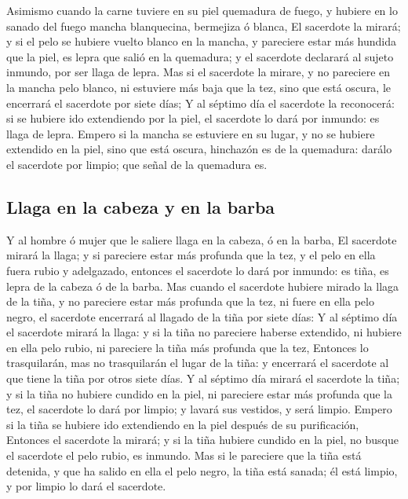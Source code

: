  Asimismo cuando la carne tuviere en su piel quemadura de
fuego, y hubiere en lo sanado del fuego mancha blanquecina, bermejiza ó
blanca,  El sacerdote la mirará; y si el pelo se hubiere
vuelto blanco en la mancha, y pareciere estar más hundida que la piel,
es lepra que salió en la quemadura; y el sacerdote declarará al sujeto
inmundo, por ser llaga de lepra.  Mas si el sacerdote la
mirare, y no pareciere en la mancha pelo blanco, ni estuviere más baja
que la tez, sino que está oscura, le encerrará el sacerdote por siete
días;  Y al séptimo día el sacerdote la reconocerá: si se
hubiere ido extendiendo por la piel, el sacerdote lo dará por inmundo:
es llaga de lepra.  Empero si la mancha se estuviere en su
lugar, y no se hubiere extendido en la piel, sino que está oscura,
hinchazón es de la quemadura: darálo el sacerdote por limpio; que señal
de la quemadura es.

\hypertarget{llaga-en-la-cabeza-y-en-la-barba}{%
\subsection{Llaga en la cabeza y en la
barba}\label{llaga-en-la-cabeza-y-en-la-barba}}

 Y al hombre ó mujer que le saliere llaga en la cabeza, ó
en la barba,  El sacerdote mirará la llaga; y si pareciere
estar más profunda que la tez, y el pelo en ella fuera rubio y
adelgazado, entonces el sacerdote lo dará por inmundo: es tiña, es lepra
de la cabeza ó de la barba.  Mas cuando el sacerdote
hubiere mirado la llaga de la tiña, y no pareciere estar más profunda
que la tez, ni fuere en ella pelo negro, el sacerdote encerrará al
llagado de la tiña por siete días:  Y al séptimo día el
sacerdote mirará la llaga: y si la tiña no pareciere haberse extendido,
ni hubiere en ella pelo rubio, ni pareciere la tiña más profunda que la
tez,  Entonces lo trasquilarán, mas no trasquilarán el
lugar de la tiña: y encerrará el sacerdote al que tiene la tiña por
otros siete días.  Y al séptimo día mirará el sacerdote la
tiña; y si la tiña no hubiere cundido en la piel, ni pareciere estar más
profunda que la tez, el sacerdote lo dará por limpio; y lavará sus
vestidos, y será limpio.  Empero si la tiña se hubiere ido
extendiendo en la piel después de su purificación, 
Entonces el sacerdote la mirará; y si la tiña hubiere cundido en la
piel, no busque el sacerdote el pelo rubio, es inmundo. 
Mas si le pareciere que la tiña está detenida, y que ha salido en ella
el pelo negro, la tiña está sanada; él está limpio, y por limpio lo dará
el sacerdote.

